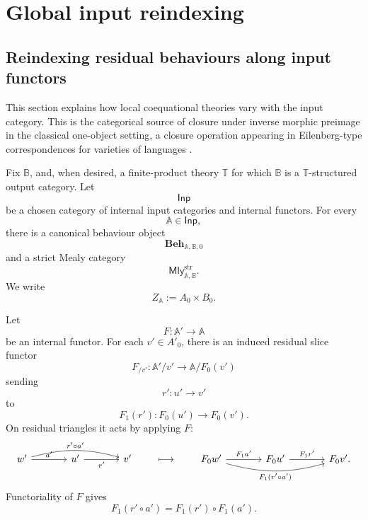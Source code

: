 \section{Global input reindexing}
\label{sec:global-input-reindexing}

\subsection{Reindexing residual behaviours along input functors}
\label{subsec:input-reindexing-behaviours}

This section explains how local coequational theories vary with the input
category. This is the categorical source of closure under inverse morphic
preimage in the classical one-object setting, a closure operation appearing in
Eilenberg-type correspondences for varieties of languages
\cite{Eilenberg1974,AdamekMiliusMyersUrbat2019TOCL}.

Fix \(\mathbb B\), and, when desired, a finite-product theory \(\mathbb T\) for
which \(\mathbb B\) is a \(\mathbb T\)-structured output category. Let
\[
    \mathsf{Inp}
\]
be a chosen category of internal input categories and internal functors. For
every
\[
    \mathbb A\in\mathsf{Inp},
\]
there is a canonical behaviour object
\[
    \mathbf{Beh}_{\mathbb A,\mathbb B,0}
\]
and a strict Mealy category
\[
    \mathsf{Mly}^{\mathrm{str}}_{\mathbb A,\mathbb B}.
\]
We write
\[
    Z_{\mathbb A}:=A_0\times B_0.
\]

Let
\[
    F:\mathbb A'\to\mathbb A
\]
be an internal functor. For each \(v'\in A'_0\), there is an induced residual
slice functor
\[
    F_{/v'}:
    \mathbb A'/v'\to \mathbb A/F_0(v')
\]
sending
\[
    r':u'\to v'
\]
to
\[
    F_1(r'):F_0(u')\to F_0(v').
\]
On residual triangles it acts by applying \(F\):
\[
\begin{tikzcd}[column sep=large, row sep=large]
    w'
        \arrow[r, "a'"]
        \arrow[rr, "r'\circ a'", bend left=15]
    &
    u'
        \arrow[r, "r'"']
    &
    v'
\end{tikzcd}
\qquad\longmapsto\qquad
\begin{tikzcd}[column sep=large, row sep=large]
    F_0w'
        \arrow[r, "F_1a'"]
        \arrow[rr, "F_1(r'\circ a')"', bend right=15]
    &
    F_0u'
        \arrow[r, "F_1r'"]
    &
    F_0v'.
\end{tikzcd}
\]
Functoriality of \(F\) gives
\[
    F_1(r'\circ a')=F_1(r')\circ F_1(a').
\]

